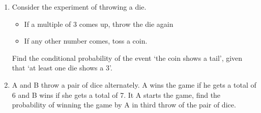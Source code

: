 \begin{enumerate}[label=\thechapter.\arabic*,ref=\thechapter.\theenumi]
	\item Consider the experiment of throwing a die.
    \begin{itemize}
        \item If a multiple of 3 comes up, throw the die again
        \item If any other number comes, toss a coin.
    \end{itemize}
     Find the conditional probability of the event \lq the coin shows a tail\rq, given that \lq at least one die shows a 3\rq.\\
		
  \item
  A and B throw a pair of dice alternately. A wins the game if he gets a total of
6 and B wins if she gets a total of 7. It A starts the game, find the probability of
winning the game by A in third throw of the pair of dice.

\end{enumerate}

